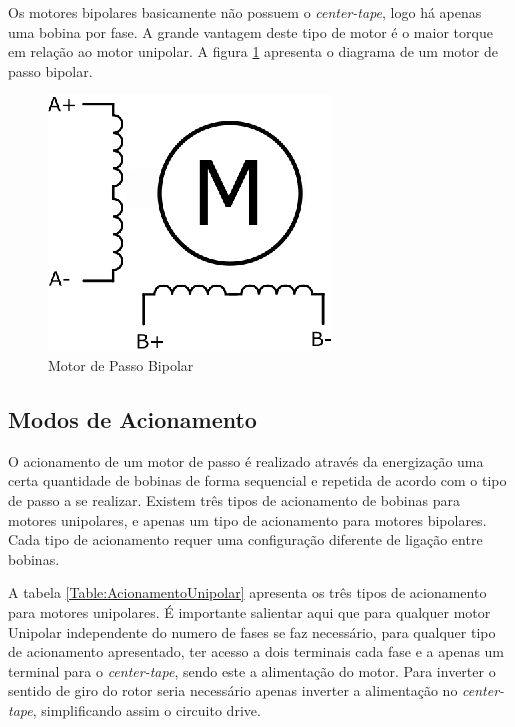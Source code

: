 Os motores bipolares basicamente não possuem o \emph{center-tape}, logo há apenas uma bobina por fase. A grande vantagem deste tipo de motor é o maior torque em relação ao motor unipolar. A figura \ref{fig:MotorDePassoBipolar} apresenta o diagrama de um motor de passo bipolar.

\begin{figure}[H]
	\centering
	\includegraphics[width = 0.3\columnwidth]{images/MotorDePassoBipolar.eps}
	\caption{Motor de Passo Bipolar}
	\label{fig:MotorDePassoBipolar}
\end{figure}


\subsection{Modos de Acionamento} 

O acionamento de um motor de passo é realizado através da energização uma certa quantidade de bobinas de forma sequencial e repetida de acordo com o tipo de passo a se realizar. Existem três tipos de acionamento de bobinas para motores unipolares, e apenas um tipo de acionamento para motores bipolares. Cada tipo de acionamento requer uma configuração diferente de ligação entre bobinas.

A tabela \ref{Table:AcionamentoUnipolar} apresenta os três tipos de acionamento para motores unipolares. É importante salientar aqui que  para qualquer motor Unipolar independente do numero de fases se faz necessário, para qualquer tipo de acionamento apresentado, ter acesso a dois terminais cada fase e a apenas um terminal para o \emph{center-tape}, sendo este a alimentação do motor. Para inverter o sentido de giro do rotor seria necessário apenas inverter a alimentação no \emph{center-tape}, simplificando assim o circuito drive. 


